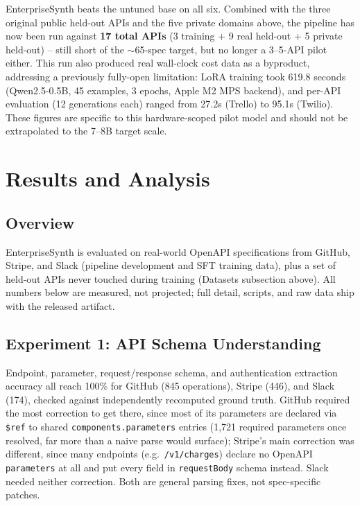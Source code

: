 \documentclass[11pt]{article}
\begin{document}
EnterpriseSynth beats the untuned base on all six. Combined with the three original public
held-out APIs and the five private domains above, the pipeline has now been run against
\textbf{17 total APIs} (3 training + 9 real held-out + 5 private held-out) -- still short of the
$\sim$65-spec target, but no longer a 3--5-API pilot either. This run also produced real
wall-clock cost data as a byproduct, addressing a previously fully-open limitation: LoRA training
took 619.8 seconds (Qwen2.5-0.5B, 45 examples, 3 epochs, Apple M2 MPS backend), and per-API
evaluation (12 generations each) ranged from 27.2s (Trello) to 95.1s (Twilio). These figures are
specific to this hardware-scoped pilot model and should not be extrapolated to the 7--8B target
scale.

\section{Results and Analysis}

\subsection{Overview}
EnterpriseSynth is evaluated on real-world OpenAPI specifications from GitHub, Stripe, and Slack
(pipeline development and SFT training data), plus a set of held-out APIs never touched during
training (Datasets subsection above). All numbers below are measured, not projected; full detail,
scripts, and raw data ship with the released artifact.

\subsection{Experiment 1: API Schema Understanding}
Endpoint, parameter, request/response schema, and authentication extraction accuracy all reach
100\% for GitHub (845 operations), Stripe (446), and Slack (174), checked against independently
recomputed ground truth. GitHub required the most correction to get there, since most of its
parameters are declared via \texttt{\$ref} to shared \texttt{components.parameters} entries
(1{,}721 required parameters once resolved, far more than a naive parse would surface); Stripe's
main correction was different, since many endpoints (e.g.\ \texttt{/v1/charges}) declare no
OpenAPI \texttt{parameters} at all and put every field in \texttt{requestBody} schema instead.
Slack needed neither correction. Both are general parsing fixes, not spec-specific patches.
\end{document}
